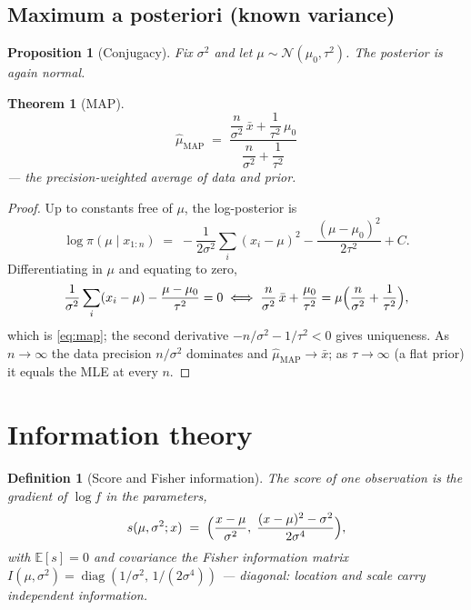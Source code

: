 \documentclass[11pt]{article}
\newtheorem{definition}{Definition}
\newtheorem{theorem}{Theorem}
\newtheorem{proposition}{Proposition}
\theoremstyle{remark}
\newcommand{\E}{\mathbb{E}}
\newcommand{\xbar}{\bar{x}}
\begin{document}
\subsection{Maximum a posteriori (known variance)}

\begin{proposition}[Conjugacy]
Fix $\sigma^2$ and let $\mu \sim \mathcal{N}(\mu_0, \tau^2)$. The
posterior is again normal.
\end{proposition}

\begin{theorem}[MAP]
\begin{equation}
  \boxed{\;\hat\mu_{\mathrm{MAP}}
  \;=\; \frac{\dfrac{n}{\sigma^2}\,\xbar + \dfrac{1}{\tau^2}\,\mu_0}
             {\dfrac{n}{\sigma^2} + \dfrac{1}{\tau^2}}\;}
  \label{eq:map}
\end{equation}
--- the precision-weighted average of data and prior.
\end{theorem}

\begin{proof}
Up to constants free of $\mu$, the log-posterior is
\begin{equation*}
  \log \pi(\mu \mid x_{1:n})
  \;=\; -\frac{1}{2\sigma^2}\sum_i (x_i - \mu)^2
        - \frac{(\mu - \mu_0)^2}{2\tau^2} + C.
\end{equation*}
Differentiating in $\mu$ and equating to zero,
\begin{equation*}
  \frac{1}{\sigma^2}\sum_i (x_i - \mu) - \frac{\mu - \mu_0}{\tau^2}
  = 0
  \;\Longleftrightarrow\;
  \frac{n}{\sigma^2}\,\xbar + \frac{\mu_0}{\tau^2}
  = \mu\Bigl(\frac{n}{\sigma^2} + \frac{1}{\tau^2}\Bigr),
\end{equation*}
which is \eqref{eq:map}; the second derivative
$-n/\sigma^2 - 1/\tau^2 < 0$ gives uniqueness. As $n \to \infty$ the
data precision $n/\sigma^2$ dominates and
$\hat\mu_{\mathrm{MAP}} \to \xbar$; as $\tau \to \infty$ (a flat
prior) it equals the MLE at every $n$.
\end{proof}

\section{Information theory}

\begin{definition}[Score and Fisher information]
The score of one observation is the gradient of $\log f$ in the
parameters,
\begin{equation}
  s(\mu, \sigma^2; x) \;=\;
  \Bigl(\frac{x - \mu}{\sigma^2},\;
  \frac{(x-\mu)^2 - \sigma^2}{2\sigma^4}\Bigr),
  \label{eq:score}
\end{equation}
with $\E[s] = 0$ and covariance the Fisher information matrix
$I(\mu, \sigma^2) = \operatorname{diag}(1/\sigma^2,\, 1/(2\sigma^4))$
--- diagonal: location and scale carry independent information.
\end{definition}
\end{document}
